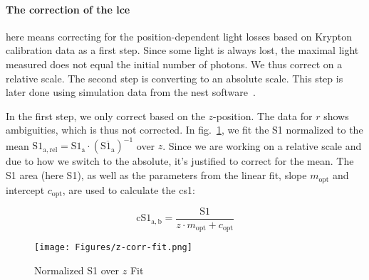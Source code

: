 \paragraph{The correction of the \gls{lce}} here means correcting for the position-dependent light losses based on Krypton calibration data as a first step.
Since some light is always lost, the maximal light measured does not equal the initial number of photons.
We thus correct on a relative scale.
The second step is converting to an absolute scale.
This step is later done using simulation data from the \gls{nest} software~\cite{?}.  %

In the first step, we only correct based on the $ z $-position.
The data for $ r $ shows ambiguities, which is thus not corrected.
In fig.~\ref{fig:s1area_vs_z}, we fit the S1 normalized to the mean $ \mathrm{S1_{a,rel}} = \mathrm{S1_a} \cdot \left( \overline{\mathrm{S1_a}} \right)^{-1} $ over $ z $.  %
Since we are working on a relative scale and due to how we switch to the absolute, it's justified to correct for the mean.
The S1 area (here S1), as well as the parameters from the linear fit, slope $ m_\mathrm{opt} $ and intercept $ c_\mathrm{opt} $, are used to calculate the \gls{cs1}:

\begin{equation}
    \mathrm{cS1}_\mathrm{a,b} = \frac{ \mathrm{S1} }{ z \cdot m_\mathrm{opt} + c_\mathrm{opt} }
\end{equation}

\begin{figure}
\centering
    \texttt{[image: Figures/z-corr-fit.png]}  %
\caption[Normalized S1 over $ z $ Fit]{
    Normalized S1 over $ z $ Fit
    }
\label{fig:s1area_vs_z}
\end{figure}













